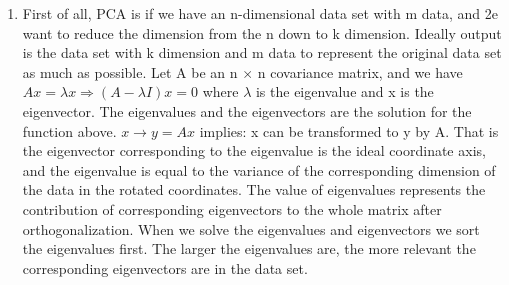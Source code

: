 \documentclass[10pt]{article}
\begin{document}
\begin{enumerate}
    \item
        First of all, PCA is if we have an n-dimensional data set with m data, and 2e want to reduce the dimension from the n down to k dimension. Ideally output is the data set with k dimension and m data to represent the original data set as much as possible. Let A be an n $\times$ n  covariance matrix, and we have $Ax = \lambda x \Rightarrow (A - \lambda I) x = 0$ where $\lambda$ is the eigenvalue and x is the eigenvector. The eigenvalues and the eigenvectors are the solution for the function above. $x \rightarrow y = Ax$ implies: x can be transformed to y by A. That is the eigenvector corresponding to the eigenvalue is the ideal coordinate axis, and the eigenvalue is equal to the variance of the corresponding dimension of the data in the rotated coordinates. The value of eigenvalues represents the contribution of corresponding eigenvectors to the whole matrix after orthogonalization. When we solve the eigenvalues and eigenvectors we sort the eigenvalues first. The larger the eigenvalues are, the more relevant the corresponding eigenvectors are in the data set.
\end{enumerate}
\end{document}
